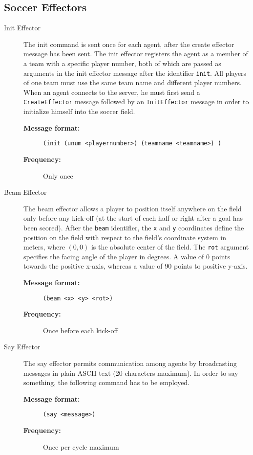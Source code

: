 \subsection{Soccer Effectors}


\begin{description}


  \item [Init Effector]
  The init command is sent once for each agent, after the create effector message has been sent. The init effector registers the agent as a member of a team with a specific player number, both of which are passed as arguments in the init effector message after the identifier \texttt{init}. All players of one team must use the same team name and different player numbers. When an agent connects to the server, he must first send a \texttt{CreateEffector} message followed by an \texttt{InitEffector} message in order to initialize himself into the soccer field.
  \begin{description}
  \item[{\bf Message format:}]  
  \texttt{(init (unum <playernumber>) (teamname <teamname>) )}
  \item[{\bf Frequency:}]
  Only once
  \end{description}



  \item [Beam Effector]
  The beam effector allows a player to position itself anywhere on the field only before any kick-off (at the start of each half or right after a goal has been scored). After the \texttt{beam} identifier, the \texttt{x} and \texttt{y} coordinates define the position on the field with respect to the field's coordinate system in meters, where $(0,0)$ is the absolute center of the field. The \texttt{rot} argument specifies the facing angle of the player in degrees. A value of 0 points towards the positive x-axis, whereas a value of 90 points to positive y-axis.
  \begin{description}
  \item[{\bf Message format:}]  
  \texttt{(beam <x> <y> <rot>)}
  \item[{\bf Frequency:}]
  Once before each kick-off
  \end{description}



  \item [Say Effector]
  The say effector permits communication among agents by broadcasting messages in plain ASCII text (20 characters maximum). In order to say something, the following command has to be employed.
  \begin{description}
  \item[{\bf Message format:}]
  \texttt{(say <message>)}
  \item[{\bf Frequency:}]
  Once per cycle maximum
  \end{description}

\end{description}
